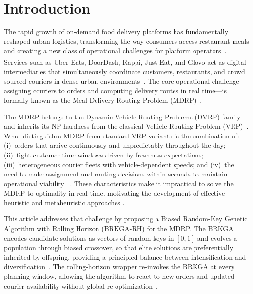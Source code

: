 \documentclass[runningheads]{llncs}
\begin{document}
\section{Introduction}

The rapid growth of on-demand food delivery platforms has fundamentally reshaped urban logistics, transforming the way consumers access restaurant meals and creating a new class of operational challenges for platform operators~\cite{ref-savelsbergh2022}.
Services such as Uber Eats\textsuperscript{\textregistered}, DoorDash\textsuperscript{\textregistered}, Rappi\textsuperscript{\textregistered},
Just Eat\textsuperscript{\textregistered}, and Glovo\textsuperscript{\textregistered}
act as digital intermediaries that simultaneously coordinate customers, restaurants, and crowd sourced couriers in dense urban environments~\cite{ref-bates2018,ref-reyes2018}.
The core operational challenge—assigning couriers to orders and computing delivery routes in real time—is formally known as the Meal Delivery Routing Problem (MDRP)~\cite{ref-reyes2018}.

The MDRP belongs to the Dynamic Vehicle Routing Problems (DVRP) family and inherits its NP-hardness from the classical Vehicle Routing Problem (VRP)~\cite{ref-wen2010}. What distinguishes MDRP from standard VRP variants is the combination of: (i)~orders that arrive continuously and unpredictably throughout the day; (ii)~tight customer time windows driven by freshness expectations; (iii)~heterogeneous courier fleets with vehicle-dependent speeds; and (iv)~the need to make assignment and routing decisions within seconds to maintain operational viability ~\cite{ref-ulmer2021,ref-haferkamp2022,ref-auad2023}. These characteristics make it impractical to solve the MDRP to optimality in real time, motivating the development of effective heuristic and metaheuristic approaches \cite{ref-liao2020,ref-xie2024}. 

This article addresses that challenge by proposing a Biased Random-Key Genetic Algorithm with Rolling Horizon (BRKGA-RH) for the MDRP. The BRKGA encodes candidate solutions as vectors of random keys in $[0,1]$ and evolves a population through biased crossover, so that elite solutions are preferentially inherited by offspring,
providing a principled balance between intensification and diversification~\cite{ref-goncalves2011}. The rolling-horizon wrapper re-invokes the BRKGA at every planning window, allowing the algorithm to react to new orders and updated courier availability without global re-optimization~\cite{ref-steever2019}. 
\end{document}
